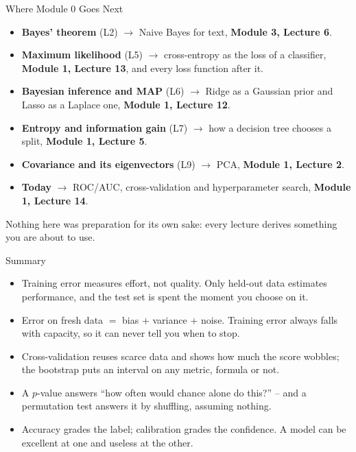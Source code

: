 \begin{frame}{Where Module 0 Goes Next}
\small
\begin{itemize}
  \item \textbf{Bayes' theorem} (L2) $\rightarrow$ Naive Bayes for text, \textbf{Module 3, Lecture 6}.
  \pause
  \item \textbf{Maximum likelihood} (L5) $\rightarrow$ cross-entropy as the loss of a classifier, \textbf{Module 1, Lecture 13}, and every loss function after it.
  \pause
  \item \textbf{Bayesian inference and MAP} (L6) $\rightarrow$ Ridge as a Gaussian prior and Lasso as a Laplace one, \textbf{Module 1, Lecture 12}.
  \pause
  \item \textbf{Entropy and information gain} (L7) $\rightarrow$ how a decision tree chooses a split, \textbf{Module 1, Lecture 5}.
  \pause
  \item \textbf{Covariance and its eigenvectors} (L9) $\rightarrow$ PCA, \textbf{Module 1, Lecture 2}.
  \pause
  \item \textbf{Today} $\rightarrow$ ROC/AUC, cross-validation and hyperparameter search, \textbf{Module 1, Lecture 14}.
\end{itemize}
\pause
\begin{rlintuition}
Nothing here was preparation for its own sake: every lecture derives something you are about to use.
\end{rlintuition}
\end{frame}

\begin{frame}{Summary}
\begin{itemize}
  \item Training error measures effort, not quality. Only held-out data estimates performance, and the test set is spent the moment you choose on it.
  \pause
  \item Error on fresh data $=$ bias $+$ variance $+$ noise. Training error always falls with capacity, so it can never tell you when to stop.
  \pause
  \item Cross-validation reuses scarce data and shows how much the score wobbles; the bootstrap puts an interval on any metric, formula or not.
  \pause
  \item A $p$-value answers ``how often would chance alone do this?'' -- and a permutation test answers it by shuffling, assuming nothing.
  \pause
  \item Accuracy grades the label; calibration grades the confidence. A model can be excellent at one and useless at the other.
\end{itemize}
\end{frame}
